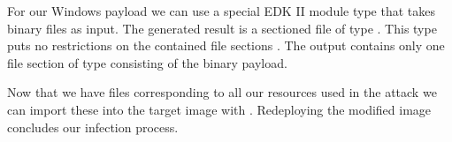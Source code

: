 For our Windows payload we can use a special \ac{EDK} II module type that takes binary files as input.
The generated result is a sectioned file of type .
This type puts no restrictions on the contained file sections \cite[Vol. 3, 2.1.4.1.7]{pi-spec}.
The output contains only one file section of type  consisting of the binary payload.

Now that we have  files corresponding to all our resources used in the attack we can import these into the target image with .
Redeploying the modified image concludes our infection process.

\clearpage
